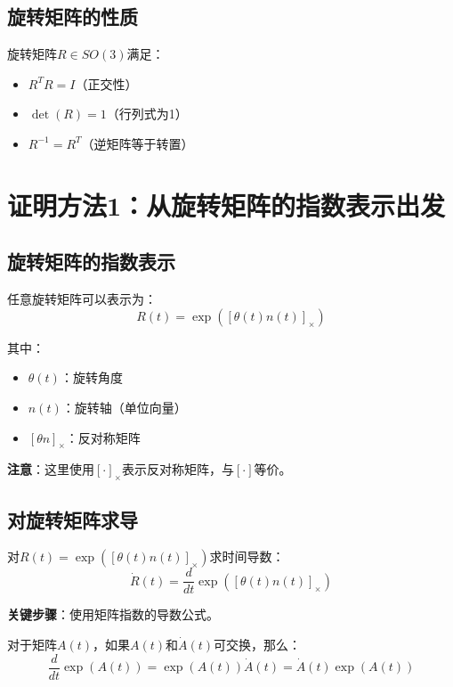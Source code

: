 \documentclass[12pt,a4paper]{article}
\begin{document}
\subsection{旋转矩阵的性质}

旋转矩阵$R \in SO(3)$满足：
\begin{itemize}
\item $R^T R = I$（正交性）
\item $\det(R) = 1$（行列式为1）
\item $R^{-1} = R^T$（逆矩阵等于转置）
\end{itemize}

\section{证明方法1：从旋转矩阵的指数表示出发}

\subsection{旋转矩阵的指数表示}

任意旋转矩阵可以表示为：
\begin{equation}
R(t) = \exp([\theta(t) n(t)]_{\times})
\end{equation}

其中：
\begin{itemize}
\item $\theta(t)$：旋转角度
\item $n(t)$：旋转轴（单位向量）
\item $[\theta n]_{\times}$：反对称矩阵
\end{itemize}

\textbf{注意}：这里使用$[\cdot]_{\times}$表示反对称矩阵，与$[\cdot]$等价。

\subsection{对旋转矩阵求导}

对$R(t) = \exp([\theta(t) n(t)]_{\times})$求时间导数：
\begin{equation}
\dot{R}(t) = \frac{d}{dt} \exp([\theta(t) n(t)]_{\times})
\end{equation}

\textbf{关键步骤}：使用矩阵指数的导数公式。

对于矩阵$A(t)$，如果$A(t)$和$\dot{A}(t)$可交换，那么：
\begin{equation}
\frac{d}{dt} \exp(A(t)) = \exp(A(t)) \dot{A}(t) = \dot{A}(t) \exp(A(t))
\end{equation}
\end{document}

